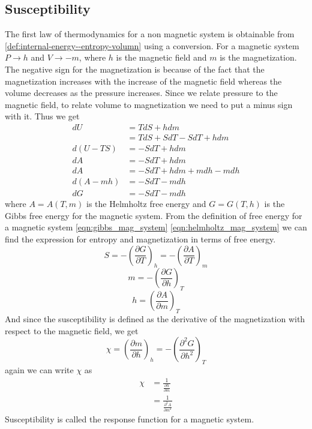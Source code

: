 	\subsection{Susceptibility}
	The first law of thermodynamics for a non magnetic system is obtainable from \ref{def:internal-energy--entropy-volumn} using a conversion.	For a magnetic system $P \rightarrow h$ and $V \rightarrow -m$, where $h$ is the magnetic field and $m$ is the magnetization. The negative sign for the magnetization is because of the fact that the magnetization increases with the increase of the magnetic field whereas the volume decreases as the pressure increases. Since we relate pressure to the magnetic field, to relate volume to magnetization we need to put a minus sign with it. Thus we get
	\begin{align}
		dU &= TdS + hdm \\
		   &= TdS + SdT - SdT + h dm \\
		d(U - TS)  &= -SdT + h dm \\
		dA &= -SdT + h dm \label{eqn:helmholtz_mag_system} \\
		dA &= -SdT + h dm + m dh -m dh \\
		d(A - mh) &= -SdT - m dh\\
		dG &= -SdT -m dh \label{eqn:gibbs_mag_system}
	\end{align} 
	where $A=A(T,m)$ is the  Helmholtz free energy and $G=G(T,h)$ is the Gibbs free energy for the magnetic system. From the definition of free energy for a magnetic system \ref{eqn:gibbs_mag_system} \ref{eqn:helmholtz_mag_system} we can find the expression for entropy and magnetization in terms of free energy.
	\begin{equation}
		S = -\left(\frac{\partial G}{\partial T}\right)_h = -\left(\frac{\partial A}{\partial T}\right)_m
	\end{equation}
	\begin{equation}
		m = -\left(\frac{\partial G}{\partial h}\right)_T
		\label{eqn:magnetization_def}
	\end{equation}
	\begin{equation}
		h = \left(\frac{\partial A}{\partial m}\right)_T
		\label{eqn:mag_field_def}
	\end{equation}	
	And since the susceptibility is defined as the derivative of the magnetization with respect to the magnetic field, we get
	\begin{equation}
		\chi = \left(\frac{\partial m}{\partial h}\right)_h = - \left(\frac{\partial^2G}{\partial h ^2}\right)_T
		\label{eqn:susceptibility_def}
	\end{equation}
	again we can write $\chi$ as
	\begin{align}
		\chi &= \frac{1}{\frac{\partial h}{\partial m}} \nonumber \\
			 &= \frac{1}{\frac{\partial^2 A}{\partial m ^2}} \label{eqn:susceptibility_def2}
	\end{align}
	Susceptibility is called the response function for a magnetic system.
	
